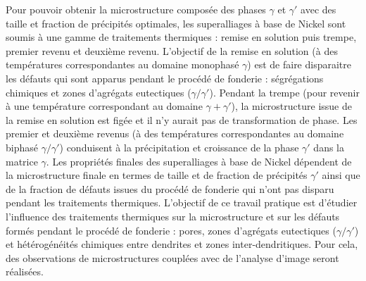 Pour pouvoir obtenir la microstructure composée des phases $\gamma$ et $\gamma'$ avec des taille et fraction de précipités optimales, les superalliages à base de Nickel sont soumis à une gamme de traitements thermiques : remise en solution puis trempe, premier revenu et deuxième revenu. L’objectif de la remise en solution (à des températures correspondantes au domaine monophasé $\gamma$) est de faire disparaitre les défauts qui sont apparus pendant le procédé de fonderie : ségrégations chimiques et zones d’agrégats eutectiques ($\gamma / \gamma'$). Pendant la trempe (pour revenir à une température correspondant au domaine $\gamma + \gamma'$), la microstructure issue de la remise en solution est figée et il n’y aurait pas de transformation de phase. Les premier et deuxième revenus (à des températures correspondantes au domaine biphasé $\gamma / \gamma'$) conduisent à la précipitation et croissance de la phase $\gamma'$ dans la matrice $\gamma$. Les propriétés finales des superalliages à base de Nickel dépendent de la microstructure finale en termes de taille et de fraction de précipités $\gamma'$ ainsi que de la fraction de défauts issues du procédé de fonderie qui n’ont pas disparu pendant les traitements thermiques.
L’objectif de ce travail pratique est d’étudier l’influence des traitements thermiques sur la microstructure et sur les défauts formés pendant le procédé de fonderie : pores, zones d’agrégats eutectiques ($\gamma / \gamma'$) et hétérogénéités chimiques entre dendrites et zones inter-dendritiques. Pour cela, des observations de microstructures couplées avec de l’analyse d’image seront réalisées.
